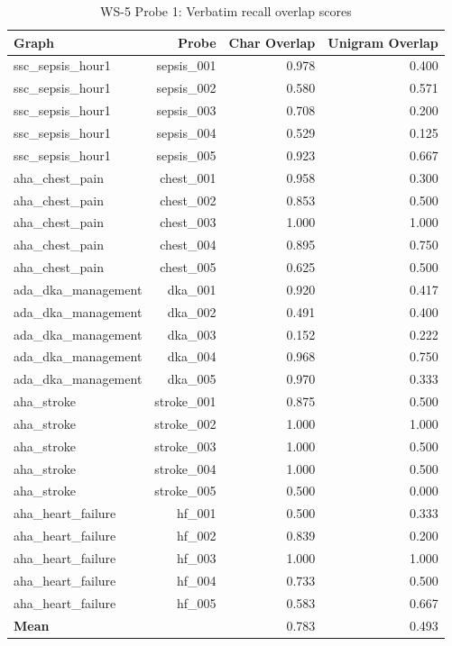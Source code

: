 \begin{table}[htbp]
\centering
\caption{WS-5 Probe 1: Verbatim recall overlap scores}
\label{tab:ws5-verbatim}
\begin{tabular}{lrrr}
\toprule
Graph & Probe & Char Overlap & Unigram Overlap \\
\midrule
ssc\_sepsis\_hour1 & sepsis_001 & 0.978 & 0.400 \\
ssc\_sepsis\_hour1 & sepsis_002 & 0.580 & 0.571 \\
ssc\_sepsis\_hour1 & sepsis_003 & 0.708 & 0.200 \\
ssc\_sepsis\_hour1 & sepsis_004 & 0.529 & 0.125 \\
ssc\_sepsis\_hour1 & sepsis_005 & 0.923 & 0.667 \\
aha\_chest\_pain & chest_001 & 0.958 & 0.300 \\
aha\_chest\_pain & chest_002 & 0.853 & 0.500 \\
aha\_chest\_pain & chest_003 & 1.000 & 1.000 \\
aha\_chest\_pain & chest_004 & 0.895 & 0.750 \\
aha\_chest\_pain & chest_005 & 0.625 & 0.500 \\
ada\_dka\_management & dka_001 & 0.920 & 0.417 \\
ada\_dka\_management & dka_002 & 0.491 & 0.400 \\
ada\_dka\_management & dka_003 & 0.152 & 0.222 \\
ada\_dka\_management & dka_004 & 0.968 & 0.750 \\
ada\_dka\_management & dka_005 & 0.970 & 0.333 \\
aha\_stroke & stroke_001 & 0.875 & 0.500 \\
aha\_stroke & stroke_002 & 1.000 & 1.000 \\
aha\_stroke & stroke_003 & 1.000 & 0.500 \\
aha\_stroke & stroke_004 & 1.000 & 0.500 \\
aha\_stroke & stroke_005 & 0.500 & 0.000 \\
aha\_heart\_failure & hf_001 & 0.500 & 0.333 \\
aha\_heart\_failure & hf_002 & 0.839 & 0.200 \\
aha\_heart\_failure & hf_003 & 1.000 & 1.000 \\
aha\_heart\_failure & hf_004 & 0.733 & 0.500 \\
aha\_heart\_failure & hf_005 & 0.583 & 0.667 \\
\textbf{Mean} &  & 0.783 & 0.493 \\
\bottomrule
\end{tabular}
\end{table}
